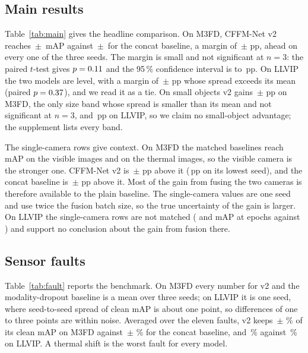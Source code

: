 \subsection{Main results}
\label{sec:main}

Table~\ref{tab:main} gives the headline comparison. On M3FD, CFFM-Net v2 reaches \resMfdCffmVtwoMeanMap{}\,$\pm$\,\resMfdCffmVtwoStdMap{} mAP against \resMfdConcatMdMeanMap{}\,$\pm$\,\resMfdConcatMdStdMap{} for the concat baseline, a margin of \marMfdVtwoVsConcatMdMeanMap{}\,$\pm$\,\marMfdVtwoVsConcatMdStdMap{}\,pp, ahead on every one of the three seeds. The margin is small and not significant at $n=3$: the paired $t$-test gives $p=0.11{}$ and the 95\,\% confidence interval is \sigMfdCiLow{} to \sigMfdCiHigh{}\,pp. On LLVIP the two models are level, with a margin of \marLlvipVtwoVsConcatMdMeanMap{}\,$\pm$\,\marLlvipVtwoVsConcatMdStdMap{}\,pp whose spread exceeds its mean (paired $p=0.37{}$), and we read it as a tie. On small objects v2 gains \marMfdVtwoVsConcatMdMeanApSmall{}\,$\pm$\,\marMfdVtwoVsConcatMdStdApSmall{}\,pp on M3FD, the only size band whose spread is smaller than its mean and not significant at $n=3$, and \marLlvipVtwoVsConcatMdMeanApSmall{}\,pp on LLVIP, so we claim no small-object advantage; the supplement lists every band.

The single-camera rows give context. On M3FD the matched baselines reach \resMfdYoloVisSeedZeroMap{} mAP on the visible images and \resMfdYoloThmSeedZeroMap{} on the thermal images, so the visible camera is the stronger one. CFFM-Net v2 is \gainMfdCffmVtwoOverBestMeanMap{}\,$\pm$\,\gainMfdCffmVtwoOverBestStdMap{}\,pp above it (\gainMfdCffmVtwoOverBestMinMap{}\,pp on its lowest seed), and the concat baseline is \gainMfdConcatMdOverBestMeanMap{}\,$\pm$\,\gainMfdConcatMdOverBestStdMap{}\,pp above it. Most of the gain from fusing the two cameras is therefore available to the plain baseline. The single-camera values are one seed and use twice the fusion batch size, so the true uncertainty of the gain is larger. On LLVIP the single-camera rows are not matched (\resLlvipYoloVisSeedZeroMap{} and \resLlvipYoloThmSeedZeroMap{} mAP at \cfgEpochsPilot{} epochs against \cfgEpochs{}) and support no conclusion about the gain from fusion there.

\subsection{Sensor faults}
\label{sec:faults}

Table~\ref{tab:fault} reports the benchmark. On M3FD every number for v2 and the modality-dropout baseline is a mean over three seeds; on LLVIP it is one seed, where seed-to-seed spread of clean mAP is about one point, so differences of one to three points are within noise. Averaged over the eleven faults, v2 keeps \fltMfdCffmVtwoMeanRetainedSevThreePercent{}\,$\pm$\,\fltMfdCffmVtwoStdRetainedSevThreePercent{}\,\% of its clean mAP on M3FD against \fltMfdConcatMdMeanRetainedSevThreePercent{}\,$\pm$\,\fltMfdConcatMdStdRetainedSevThreePercent{}\,\% for the concat baseline, and \fltLlvipCffmVtwoRetainedSevThreePercent{}\,\% against \fltLlvipConcatMdRetainedSevThreePercent{}\,\% on LLVIP. A thermal shift is the worst fault for every model.

